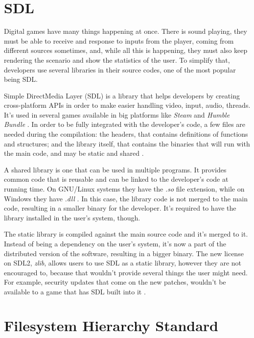 \section{SDL}
\label {sec:sdl}

Digital games have many things happening at once. There is sound playing, they must be able to receive and response to inputs from the player, coming from different sources sometimes, and, while all this is happening, they must also keep rendering the scenario and show the statistics of the user. To simplify that, developers use several libraries in their source codes, one of the most popular being SDL.

Simple DirectMedia Layer (SDL) is a library that helps developers by creating cross-platform APIs in order to make easier handling video, input, audio, threads. It's used in several games available in big platforms like \textit{Steam} and \textit{Humble Bundle} \cite{sdl2017}. In order to be fully integrated with the developer's code, a few files are needed during the compilation: the headers, that contains definitions of functions and structures; and the library itself, that contains the binaries that will run with the main code, and may be static and shared \cite{mitchell2013sdl}.

A shared library is one that can be used in multiple programs. It provides common code that is reusable and can be linked to the developer's code at running time. On GNU/Linux systems they have the \textit{.so} file extension, while on Windows they have \textit{.dll} \cite{campbell2009algorithms}. In this case, the library code is not merged to the main code, resulting in a smaller binary for the developer. It's required to have the library installed in the user's system, though.

The static library is compiled against the main source code and it's merged to it. Instead of being a dependency on the user's system, it's now a part of the distributed version of the software, resulting in a bigger binary. The new license on SDL2, \textit{zlib}\footnotemark, allows users to use SDL as a static library, however they are not encouraged to, because that wouldn't provide several things the user might need. For example, security updates that come on the new patches, wouldn't be available to a game that has SDL built into it \cite{ryangordon2017}.



\section{Filesystem Hierarchy Standard}
\label {sec:fhs}

